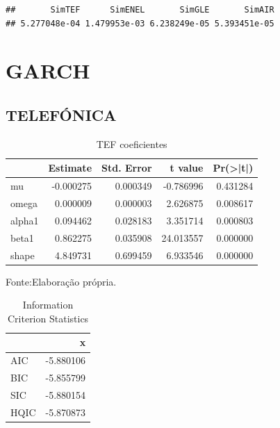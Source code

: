 \documentclass[
  12pt,
  a4paper,
  openany]{book}
\newenvironment{Shaded}{\begin{snugshade}}{\end{snugshade}}
\newcommand{\DecValTok}[1]{\textcolor[rgb]{0.00,0.00,0.81}{#1}}
\newcommand{\NormalTok}[1]{#1}
\newcommand{\OperatorTok}[1]{\textcolor[rgb]{0.81,0.36,0.00}{\textbf{#1}}}
\newcommand{\StringTok}[1]{\textcolor[rgb]{0.31,0.60,0.02}{#1}}
\begin{document}
\begin{verbatim}
##       SimTEF      SimENEL       SimGLE       SimAIR 
## 5.277048e-04 1.479953e-03 6.238249e-05 5.393451e-05
\end{verbatim}

\begin{Shaded}
\end{Shaded}

\normalsize

\hypertarget{garch}{%
\section{GARCH}\label{garch}}

\hypertarget{telefuxf3nica}{%
\subsection{TELEFÓNICA}\label{telefuxf3nica}}

\begin{table}[!h]

\caption{\label{tab:unnamed-chunk-28}TEF coeficientes}
\centering
\begin{tabular}[t]{lrrrr}
\toprule
  &  Estimate &  Std. Error &  t value & Pr(>|t|)\\
\midrule
mu & -0.000275 & 0.000349 & -0.786996 & 0.431284\\
omega & 0.000009 & 0.000003 & 2.626875 & 0.008617\\
alpha1 & 0.094462 & 0.028183 & 3.351714 & 0.000803\\
beta1 & 0.862275 & 0.035908 & 24.013557 & 0.000000\\
shape & 4.849731 & 0.699459 & 6.933546 & 0.000000\\
\bottomrule
\end{tabular}
\end{table}
\FloatBarrier
\centering

Fonte:Elaboração própria.

\justifying
\bigskip

\begin{table}[!h]

\caption{\label{tab:unnamed-chunk-29}Information Criterion Statistics}
\centering
\begin{tabular}[t]{lr}
\toprule
  & x\\
\midrule
AIC & -5.880106\\
BIC & -5.855799\\
SIC & -5.880154\\
HQIC & -5.870873\\
\bottomrule
\end{tabular}
\end{table}
\FloatBarrier
\centering
\end{document}
